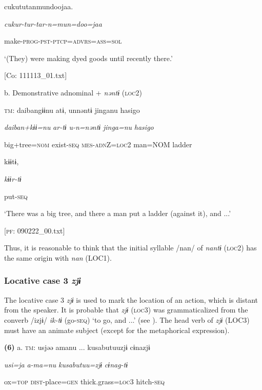       cukututanmundoojaa.

      \textit{cukur-tur-tar-n=mun=doo=jaa}

      make-\textsc{prog}-\textsc{pst}-\textsc{ptcp}=\textsc{advrs}=\textsc{ass}=\textsc{sol}

      ‘(They) were making dyed goods until recently there.’

      [Co: 111113\_01.txt]

  b.  Demonstrative adnominal + \textit{nəntɨ} (\textsc{loc}2)

    \textsc{tm}:  daibangɨɨnu  atɨ,  unnəntɨ  jinganu  {\textbar}hasigo{\textbar}

      \textit{daiban+kɨɨ=nu}  \textit{ar-tɨ}  \textit{u-n=nəntɨ}  \textit{jinga=nu}  \textit{hasigo}

      big+tree=\textsc{nom}  exist-\textsc{seq}  \textsc{mes}-\textsc{adn}Z=\textsc{loc}2  man=NOM  ladder

      kɨɨtɨ,

      \textit{kɨɨr-tɨ}

      put-\textsc{seq}

      ‘There was a big tree, and there a man put a ladder (against it), and ...’

      [\textsc{pf}: 090222\_00.txt]

Thus, it is reasonable to think that the initial syllable /nan/ of \textit{nantɨ} (\textsc{loc}2) has the same origin with \textit{nan} (LOC1).

\subsubsection{Locative case 3 \textit{zjɨ}}

The locative case 3 \textit{zjɨ} is used to mark the location of an action, which is distant from the speaker. It is probable that \textit{zjɨ} (\textsc{loc}3) was grammaticalized from the converb /izjɨ/ \textit{ik-tɨ} (go-\textsc{seq}) ‘to go, and ...’ (see ). The head verb of \textit{zjɨ} (LOC3) must have an animate subject (except for the metaphorical expression).

\textbf{(6)}  a.  \textsc{tm}:  usjəə  amanu ...  kusabutuuzjɨ  cɨnazjɨ

      \textit{usi=ja}  \textit{a-ma=nu}  \textit{kusabutuu=zjɨ}  \textit{cɨnag-tɨ}

      ox=\textsc{top}  \textsc{dist}-place=\textsc{gen}  thick.grass=\textsc{loc}3  hitch-\textsc{seq}


